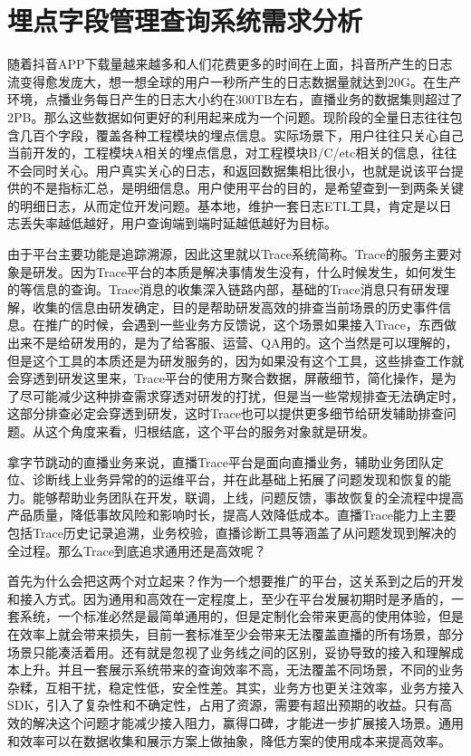 \chapter{埋点字段管理查询系统需求分析}
随着抖音APP下载量越来越多和人们花费更多的时间在上面，抖音所产生的日志流变得愈发庞大，想一想全球的用户一秒所产生的日志数据量就达到20G。在生产环境，点播业务每日产生的日志大小约在300TB左右，直播业务的数据集则超过了2PB。那么这些数据如何更好的利用起来成为一个问题。现阶段的全量日志往往包含几百个字段，覆盖各种工程模块的埋点信息。实际场景下，用户往往只关心自己当前开发的，工程模块A相关的埋点信息，对工程模块B/C/etc相关的信息，往往不会同时关心。用户真实关心的日志，和返回数据集相比很小，也就是说该平台提供的不是指标汇总，是明细信息。用户使用平台的目的，是希望查到一到两条关键的明细日志，从而定位开发问题。基本地，维护一套日志ETL工具，肯定是以日志丢失率越低越好，用户查询端到端时延越低越好为目标。

由于平台主要功能是追踪溯源，因此这里就以Trace系统简称。Trace的服务主要对象是研发。因为Trace平台的本质是解决事情发生没有，什么时候发生，如何发生的等信息的查询。Trace消息的收集深入链路内部，基础的Trace消息只有研发理解，收集的信息由研发确定，目的是帮助研发高效的排查当前场景的历史事件信息。在推广的时候，会遇到一些业务方反馈说，这个场景如果接入Trace，东西做出来不是给研发用的，是为了给客服、运营、QA用的。这个当然是可以理解的，但是这个工具的本质还是为研发服务的，因为如果没有这个工具，这些排查工作就会穿透到研发这里来，Trace平台的使用方聚合数据，屏蔽细节，简化操作，是为了尽可能减少这种排查需求穿透对研发的打扰，但是当一些常规排查无法确定时，这部分排查必定会穿透到研发，这时Trace也可以提供更多细节给研发辅助排查问题。从这个角度来看，归根结底，这个平台的服务对象就是研发。

拿字节跳动的直播业务来说，直播Trace平台是面向直播业务，辅助业务团队定位、诊断线上业务异常的的运维平台，并在此基础上拓展了问题发现和恢复的能力。能够帮助业务团队在开发，联调，上线，问题反馈，事故恢复的全流程中提高产品质量，降低事故风险和影响时长，提高人效降低成本。直播Trace能力上主要包括Trace历史记录追溯，业务校验，直播诊断工具等涵盖了从问题发现到解决的全过程。那么Trace到底追求通用还是高效呢？

首先为什么会把这两个对立起来？作为一个想要推广的平台，这关系到之后的开发和接入方式。因为通用和高效在一定程度上，至少在平台发展初期时是矛盾的，一套系统，一个标准必然是最简单通用的，但是定制化会带来更高的使用体验，但是在效率上就会带来损失，目前一套标准至少会带来无法覆盖直播的所有场景，部分场景只能凑活着用。还有就是忽视了业务线之间的区别，妥协导致的接入和理解成本上升。并且一套展示系统带来的查询效率不高，无法覆盖不同场景，不同的业务杂糅，互相干扰，稳定性低，安全性差。其实，业务方也更关注效率，业务方接入SDK，引入了复杂性和不确定性，占用了资源，需要有超出预期的收益。只有高效的解决这个问题才能减少接入阻力，赢得口碑，才能进一步扩展接入场景。通用和效率可以在数据收集和展示方案上做抽象，降低方案的使用成本来提高效率。

